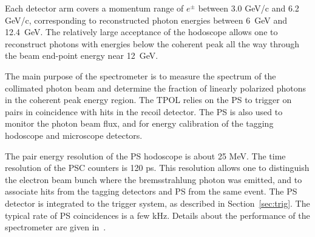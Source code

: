 Each detector arm covers a momentum range of $e^\pm$ between 3.0 GeV/c
and 6.2 GeV/c,  corresponding to reconstructed photon energies between
6~GeV and 12.4~GeV. The relatively large acceptance of the hodoscope
allows one to reconstruct photons with energies below the coherent peak
all the way through the beam end-point energy near 12~GeV.

The main purpose of the spectrometer is to measure the spectrum of the
collimated photon beam and determine the fraction of linearly polarized
photons in the coherent peak energy region. The TPOL relies on the PS
to trigger on pairs in coincidence with hits in the recoil detector.
The PS is also used to monitor the photon beam flux, and for 
energy calibration of the tagging hodoscope and microscope detectors.

The pair energy resolution of the PS hodoscope is about 25 MeV.
The time resolution of the PSC counters is 120 ps. This resolution
allows one to distinguish the electron beam bunch where the bremsstrahlung
photon was emitted, and to associate hits from the tagging detectors and PS
from the same event. The PS detector is integrated to the trigger system,
as described in Section~\ref{sec:trig}. The typical rate of PS coincidences
is a few kHz. Details about the performance of the spectrometer are given in~\cite{Somov:2017vhp,Somov:2016bgb}.



